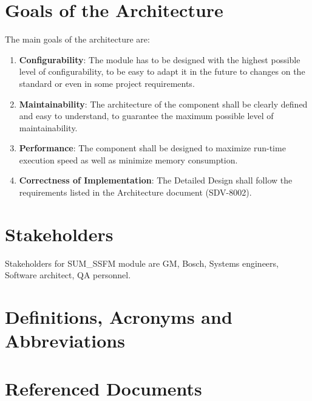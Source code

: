 \section{Goals of the Architecture}

The main goals of the architecture are:

\begin{enumerate}
\item \textbf{Configurability}: The module has to be designed with the highest possible level of configurability, to be easy to adapt it in the future to changes on the standard or even in some project requirements.
\item \textbf{Maintainability}: The architecture of the component shall be clearly defined and easy to understand, to guarantee the maximum possible level of maintainability.
\item \textbf{Performance}: The component shall be designed to maximize run-time execution speed as well as minimize memory consumption.
\item \textbf{Correctness of Implementation}: The Detailed Design shall follow the requirements listed in the Architecture document (SDV-8002).
\end{enumerate}

\section{Stakeholders}

Stakeholders for SUM\_SSFM module are GM, Bosch, Systems engineers, Software architect, QA personnel.

\section{Definitions, Acronyms and Abbreviations}



\section{Referenced Documents}

